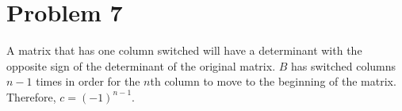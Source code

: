 \section*{Problem 7}
A matrix that has one column switched will have a determinant with
the opposite sign of the determinant of the original matrix.
$B$ has switched columns $n-1$ times in order for the $n$th column to move
to the beginning of the matrix.
Therefore, $c = (-1)^{n-1}$.